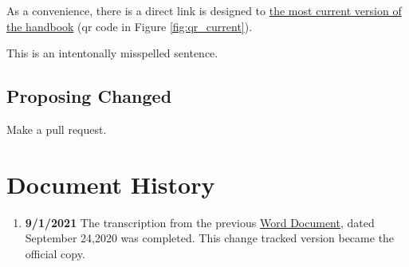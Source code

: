 \documentclass[letterpaper, 11pt]{article}
\begin{document}
		As a convenience, there is a direct link is designed to
		\href{https://github.com/djp3/WestmontFacultyHandbook/blob/main/releases/handbook.current.pdf}{the most current version of the handbook}
		(qr code in Figure \ref{fig:qr_current}).

		This is an intentonally misspelled sentence.

		\label{sec:CurrentVersion}

	\subsection{Proposing Changed}
		Make a pull request.

\section{Document History}
	\begin{enumerate}
		\item{{\bfseries 9/1/2021} The transcription from the previous \href{https://drive.google.com/file/d/1sUKRM3r9zkCWEorlwJbBRCfkCduS1yGL/view}{Word Document}, dated September 24,2020 was completed. This change tracked version became the official copy.}
	\end{enumerate}
	\cite{Winner1980}



	
	
\end{document}
